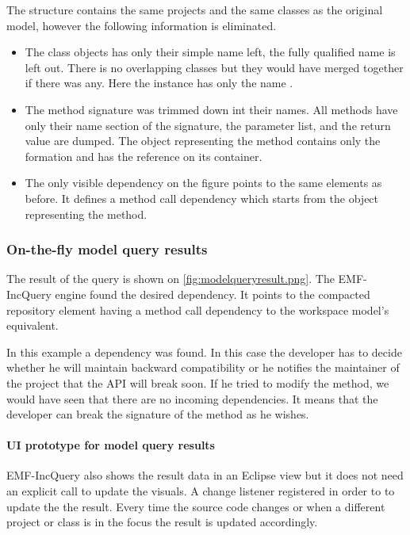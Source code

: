 The structure contains the same projects and the same
classes as the original model, however the following information is eliminated.
\begin{itemize}
  \item The class objects has only their simple name left, the fully qualified name is left out.
There is no overlapping classes but they would have merged together if
there was any. Here the  instance has only the name .
  \item The method signature was trimmed down int their names. All methods have only their 
name section of the signature, the parameter list, and the return value are dumped.    
The object representing the  method contains only the 
formation and has the reference on its container. 
  \item The only visible dependency on the figure points to the same elements as before.
  It defines a method call dependency which starts from the object representing the  method.
\end{itemize}


\subsubsection{On-the-fly model query results}
The result of the query is shown on \autoref{fig:modelqueryresult.png}.
The EMF-IncQuery engine found the desired dependency. It points to the compacted
repository element having a method call dependency to the workspace model's
equivalent.

In this example a dependency was found. In this case the developer 
has to decide whether he will maintain backward compatibility or he notifies the
maintainer of the  project that the API will break soon. If he tried
to modify the  method, we would have seen that there are no incoming
dependencies. It means that the developer can break the signature of the method as
he wishes. 

\paragraph{UI prototype for model query results}
EMF-IncQuery also shows the result data in an Eclipse view but it does not 
need an explicit call to update the visuals. A change listener registered in order
to to update the the result. Every time the source code changes or when a different
project or class is in the focus the result is updated accordingly.  







